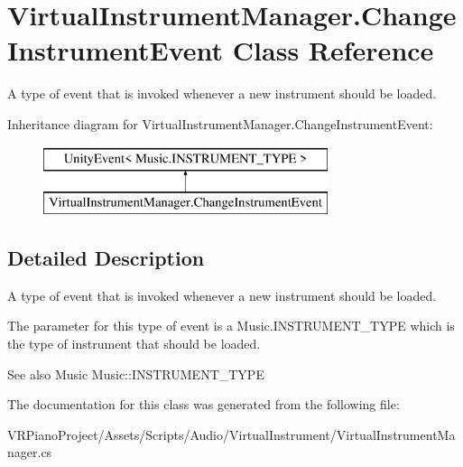 \hypertarget{class_virtual_instrument_manager_1_1_change_instrument_event}{}\section{Virtual\+Instrument\+Manager.\+Change\+Instrument\+Event Class Reference}
\label{class_virtual_instrument_manager_1_1_change_instrument_event}


A type of event that is invoked whenever a new instrument should be loaded.  


Inheritance diagram for Virtual\+Instrument\+Manager.\+Change\+Instrument\+Event\+:\begin{figure}[H]
\begin{center}
\leavevmode
\includegraphics[height=2.000000cm]{class_virtual_instrument_manager_1_1_change_instrument_event}
\end{center}
\end{figure}


\subsection{Detailed Description}
A type of event that is invoked whenever a new instrument should be loaded. 

The parameter for this type of event is a Music.\+I\+N\+S\+T\+R\+U\+M\+E\+N\+T\+\_\+\+T\+Y\+PE which is the type of instrument that should be loaded.

\begin{DoxySeeAlso}{See also}
Music Music\+::\+I\+N\+S\+T\+R\+U\+M\+E\+N\+T\+\_\+\+T\+Y\+PE 
\end{DoxySeeAlso}


The documentation for this class was generated from the following file\+:\begin{DoxyCompactItemize}
\item 
V\+R\+Piano\+Project/\+Assets/\+Scripts/\+Audio/\+Virtual\+Instrument/Virtual\+Instrument\+Manager.\+cs\end{DoxyCompactItemize}
